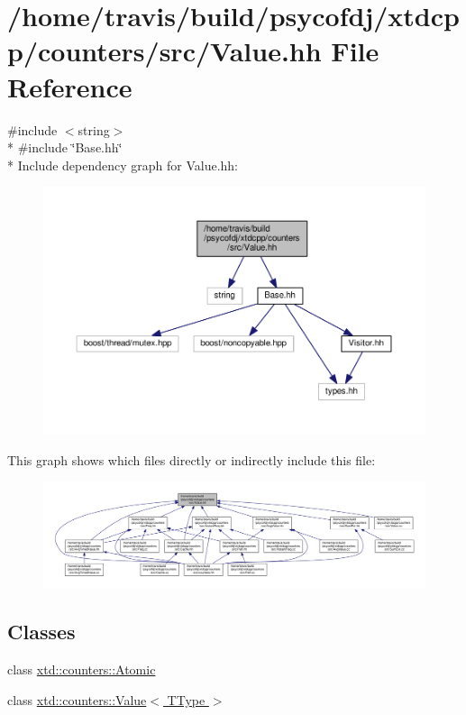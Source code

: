 \hypertarget{Value_8hh}{\section{/home/travis/build/psycofdj/xtdcpp/counters/src/\-Value.hh File Reference}
\label{Value_8hh}
}
{\ttfamily \#include $<$string$>$}\\*
{\ttfamily \#include \char`\"{}Base.\-hh\char`\"{}}\\*
Include dependency graph for Value.\-hh\-:
\nopagebreak
\begin{figure}[H]
\begin{center}
\leavevmode
\includegraphics[width=350pt]{Value_8hh__incl}
\end{center}
\end{figure}
This graph shows which files directly or indirectly include this file\-:
\nopagebreak
\begin{figure}[H]
\begin{center}
\leavevmode
\includegraphics[width=350pt]{Value_8hh__dep__incl}
\end{center}
\end{figure}
\subsection*{Classes}
\begin{DoxyCompactItemize}
\item 
class \hyperlink{classxtd_1_1counters_1_1Atomic}{xtd\-::counters\-::\-Atomic}
\item 
class \hyperlink{classxtd_1_1counters_1_1Value}{xtd\-::counters\-::\-Value$<$ T\-Type $>$}
\end{DoxyCompactItemize}
